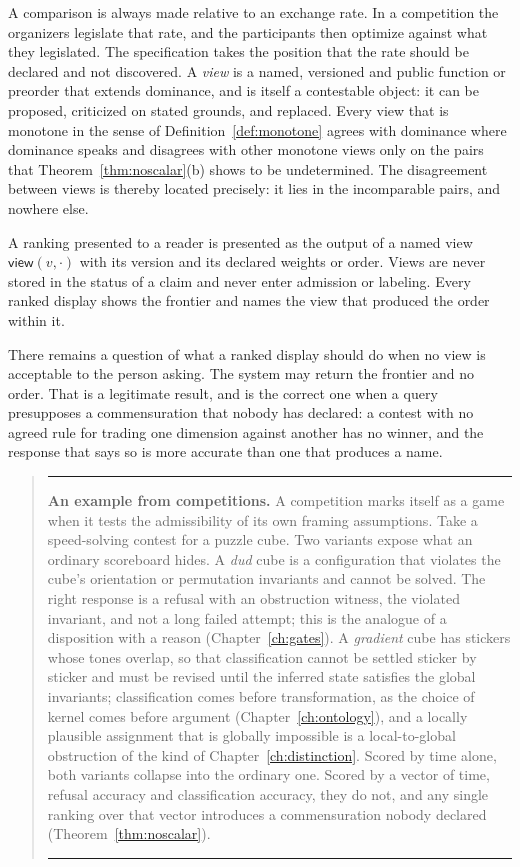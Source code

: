 A comparison is always made relative to an exchange rate. In a competition the organizers legislate that rate, and the participants then optimize against what they legislated. The specification takes the position that the rate should be declared and not discovered. A \emph{view} is a named, versioned and public function or preorder that extends dominance, and is itself a contestable object: it can be proposed, criticized on stated grounds, and replaced. Every view that is monotone in the sense of Definition~\ref{def:monotone} agrees with dominance where dominance speaks and disagrees with other monotone views only on the pairs that Theorem~\ref{thm:noscalar}(b) shows to be undetermined. The disagreement between views is thereby located precisely: it lies in the incomparable pairs, and nowhere else.

\begin{designrule}\label{rule:views}
A ranking presented to a reader is presented as the output of a named view $\mathsf{view}(v,\cdot)$ with its version and its declared weights or order. Views are never stored in the status of a claim and never enter admission or labeling. Every ranked display shows the frontier and names the view that produced the order within it.
\end{designrule}

There remains a question of what a ranked display should do when no view is acceptable to the person asking. The system may return the frontier and no order. That is a legitimate result, and is the correct one when a query presupposes a commensuration that nobody has declared: a contest with no agreed rule for trading one dimension against another has no winner, and the response that says so is more accurate than one that produces a name.

\begin{quote}\small\hrule\medskip
\textbf{An example from competitions.} A competition marks itself as a game when it tests the admissibility of its own framing assumptions. Take a speed-solving contest for a puzzle cube. Two variants expose what an ordinary scoreboard hides. A \emph{dud} cube is a configuration that violates the cube's orientation or permutation invariants and cannot be solved. The right response is a refusal with an obstruction witness, the violated invariant, and not a long failed attempt; this is the analogue of a disposition with a reason (Chapter~\ref{ch:gates}). A \emph{gradient} cube has stickers whose tones overlap, so that classification cannot be settled sticker by sticker and must be revised until the inferred state satisfies the global invariants; classification comes before transformation, as the choice of kernel comes before argument (Chapter~\ref{ch:ontology}), and a locally plausible assignment that is globally impossible is a local-to-global obstruction of the kind of Chapter~\ref{ch:distinction}. Scored by time alone, both variants collapse into the ordinary one. Scored by a vector of time, refusal accuracy and classification accuracy, they do not, and any single ranking over that vector introduces a commensuration nobody declared (Theorem~\ref{thm:noscalar}).
\medskip\hrule
\end{quote}
